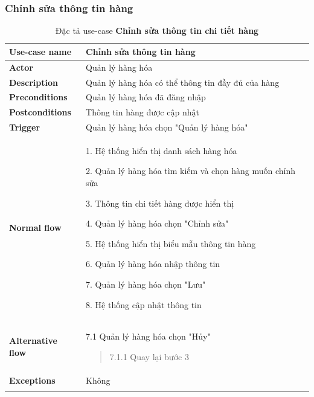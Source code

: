 \subsubsection{Chỉnh sửa thông tin hàng}
{
    \setlength\extrarowheight{6pt}
    \begin{longtable}{| p{} | p{} |}
        \hline
        \textbf{Use-case name}
         &
        Chỉnh sửa thông tin hàng
        \\
        \hline
        \textbf{Actor}
         &
        Quản lý hàng hóa
        \\
        \hline
        \textbf{Description}
         &
        Quản lý hàng hóa có thể thông tin đầy đủ của hàng
        \\
        \hline
        \textbf{Preconditions}
         &
        Quản lý hàng hóa đã đăng nhập
        \\
        \hline
        \textbf{Postconditions}
         &
        Thông tin hàng được cập nhật
        \\
        \hline
        \textbf{Trigger}
         &
        Quản lý hàng hóa chọn "Quản lý hàng hóa"
        \\
        \hline
        \begin{flushleft}
            \textbf{Normal flow}
        \end{flushleft}
         &
        1. Hệ thống hiển thị danh sách hàng hóa

        2. Quản lý hàng hóa tìm kiếm và chọn hàng muốn chỉnh sửa

        3. Thông tin chi tiết hàng được hiển thị

        4. Quản lý hàng hóa chọn "Chỉnh sửa"

        5. Hệ thống hiển thị biểu mẫu thông tin hàng

        6. Quản lý hàng hóa nhập thông tin

        7. Quản lý hàng hóa chọn "Lưu"

        8. Hệ thống cập nhật thông tin
        \\
        \hline
        \begin{flushleft}
            \textbf{Alternative flow}
        \end{flushleft}
         &
        7.1 Quản lý hàng hóa chọn "Hủy"
        \begin{quote}
            7.1.1 Quay lại bước 3
        \end{quote}
        \\
        \hline
        \textbf{Exceptions}
         &
        Không
        \\
        \hline
        \caption{Đặc tả use-case \textbf{Chỉnh sửa thông tin chi tiết hàng}}
    \end{longtable}
}

